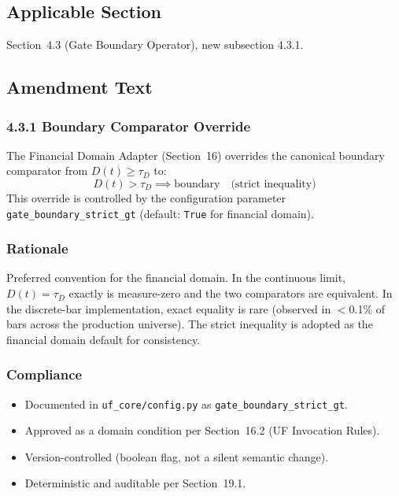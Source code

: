 \documentclass[11pt,a4paper]{article}
\begin{document}
\subsection{Applicable Section}
Section~4.3 (Gate Boundary Operator), new subsection 4.3.1.

\subsection{Amendment Text}

\subsubsection*{4.3.1 Boundary Comparator Override}

The Financial Domain Adapter (Section~16) overrides the canonical boundary
comparator from $D(t) \geq \tau_D$ to:
\[
    D(t) > \tau_D \implies \text{boundary} \quad \text{(strict inequality)}
\]
This override is controlled by the configuration parameter
\texttt{gate\_boundary\_strict\_gt} (default: \texttt{True} for financial domain).

\subsubsection*{Rationale}
Preferred convention for the financial domain. In the continuous limit,
$D(t) = \tau_D$ exactly is measure-zero and the two comparators are
equivalent. In the discrete-bar implementation, exact equality is rare
(observed in $<$0.1\% of bars across the production universe). The strict
inequality is adopted as the financial domain default for consistency.

\subsubsection*{Compliance}
\begin{itemize}
    \item Documented in \texttt{uf\_core/config.py} as \texttt{gate\_boundary\_strict\_gt}.
    \item Approved as a domain condition per Section~16.2 (UF Invocation Rules).
    \item Version-controlled (boolean flag, not a silent semantic change).
    \item Deterministic and auditable per Section~19.1.
\end{itemize}

\end{document}
